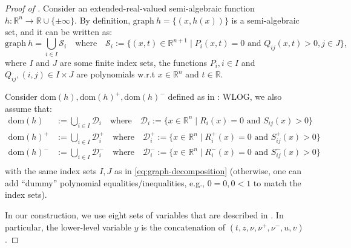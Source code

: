 \documentclass{article}
\newcommand*{\cD}{\mathcal{D}}
\newcommand*{\cS}{\mathcal{S}}
\newcommand*{\RR}{\mathbb{R}}
\newcommand{\graph}{\mathrm{graph}\ }
\newcommand{\firstvar}{x}
\newcommand{\secondvar}{y}
\newcommand{\dom}{\mathrm{dom}}
\theoremstyle{plain}
\theoremstyle{definition}
\begin{document}
\begin{proof}[Proof of ]
     Consider an extended-real-valued semi-algebraic function $h\colon \RR^n \to \RR \cup \{ \pm \infty\}$. By definition, $\graph  h =\{(x,h(x))\}$ is a semi-algebraic set, and it can be written as:
    \begin{equation}
        \label{eq:graph-decomposition}
        \graph h = \bigcup_{i \in I} \cS_i \quad \text{where} \quad \cS_i := \{(x,t) \in\RR^{n+1} \mid P_i(x,t) = 0 \text{ and } Q_{ij}(x,t) > 0, j \in J\},
    \end{equation}
    where $I$ and $J$ are some finite index sets, the functions $P_i, i \in I$ and $Q_{ij}, (i,j) \in I \times J$ are polynomials w.r.t $x \in \RR^n$ and $t \in \RR$.

    Consider $\dom(h), \dom(h)^+, \dom(h)^-$ defined as in : WLOG, we also assume that:
    \begin{equation}
        \label{eq:domain-decomposition}
        \begin{aligned}
            \dom(h) &:= \bigcup_{i \in I} \cD_i \quad \text{where} \quad \cD_i := \{\firstvar \in \RR^n \mid R_i(\firstvar) = 0 \text{ and } S_{ij}(\firstvar) > 0\}\\
            \dom(h)^+ &:= \bigcup_{i \in I} \cD^+_i \quad \text{where} \quad \cD^+_i := \{\firstvar \in \RR^n \mid R^+_i(\firstvar) = 0 \text{ and } S^+_{ij}(\firstvar) > 0\}\\
            \dom(h)^- &:= \bigcup_{i \in I} \cD^-_i \quad \text{where} \quad \cD^-_i := \{\firstvar \in \RR^n \mid R^-_i(\firstvar) = 0 \text{ and } S^-_{ij}(\firstvar) > 0\}\\
        \end{aligned}
    \end{equation}
    with the same index sets $I,J$ as in \eqref{eq:graph-decomposition} (otherwise, one can add ``dummy'' polynomial equalities/inequalities, e.g., $0 = 0, 0 < 1$  to match the index sets). 
    
    In our construction, we use eight sets of variables that are described in . In particular, the lower-level variable $\secondvar$ is the concatenation of $(t, z, \nu, \nu^+, \nu^-, u, v)$.


\end{proof}
\end{document}
